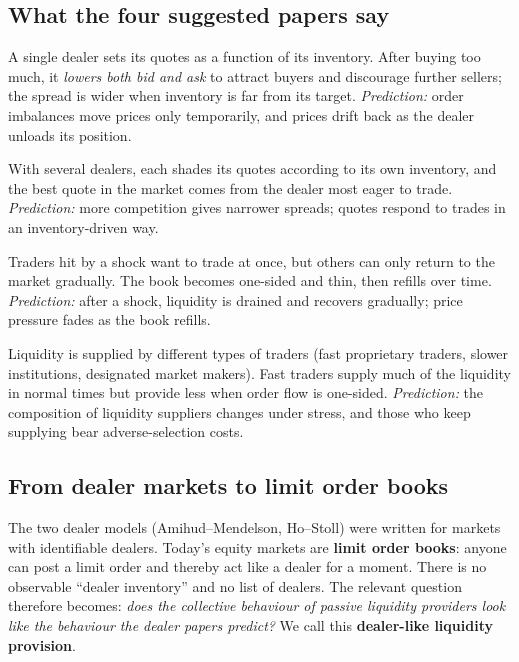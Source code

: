 \documentclass[11pt,a4paper]{article}
\begin{document}
\subsection{What the four suggested papers say}
\begin{description}[leftmargin=0pt]
\item[Amihud \& Mendelson (1980) --- inventory.] A single dealer sets its quotes as a function of its inventory.
  After buying too much, it \emph{lowers both bid and ask} to attract buyers and discourage further sellers;
  the spread is wider when inventory is far from its target. \emph{Prediction:} order imbalances move prices
  only temporarily, and prices drift back as the dealer unloads its position.
\item[Ho \& Stoll (1983) --- competing dealers.] With several dealers, each shades its quotes according to its
  own inventory, and the best quote in the market comes from the dealer most eager to trade.
  \emph{Prediction:} more competition gives narrower spreads; quotes respond to trades in an inventory-driven way.
\item[Biais \& Weill (2009) --- liquidity shocks in an order book.] Traders hit by a shock want to trade at once,
  but others can only return to the market gradually. The book becomes one-sided and thin, then refills over
  time. \emph{Prediction:} after a shock, liquidity is drained and recovers gradually; price pressure fades
  as the book refills.
\item[Biais, Declerck \& Moinas (2016) --- who supplies liquidity.] Liquidity is supplied by different types of
  traders (fast proprietary traders, slower institutions, designated market makers). Fast traders supply
  much of the liquidity in normal times but provide less when order flow is one-sided.
  \emph{Prediction:} the composition of liquidity suppliers changes under stress, and those who keep
  supplying bear adverse-selection costs.
\end{description}

\subsection{From dealer markets to limit order books}
The two dealer models (Amihud--Mendelson, Ho--Stoll) were written for markets with identifiable dealers.
Today's equity markets are \textbf{limit order books}: anyone can post a limit order and thereby act like a
dealer for a moment. There is no observable ``dealer inventory'' and no list of dealers. The relevant question
therefore becomes: \emph{does the collective behaviour of passive liquidity providers look like the behaviour
the dealer papers predict?} We call this \textbf{dealer-like liquidity provision}.
\end{document}

